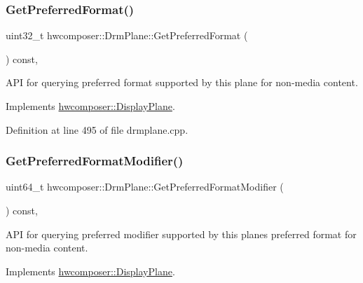 \subsubsection{\texorpdfstring{Get\+Preferred\+Format()}{GetPreferredFormat()}}
{\footnotesize\ttfamily uint32\+\_\+t hwcomposer\+::\+Drm\+Plane\+::\+Get\+Preferred\+Format (\begin{DoxyParamCaption}{ }\end{DoxyParamCaption}) const\hspace{0.3cm}{\ttfamily [override]}, {\ttfamily [virtual]}}

A\+PI for querying preferred format supported by this plane for non-\/media content. 

Implements \mbox{\hyperlink{classhwcomposer_1_1DisplayPlane_a963d17ec10be62d13f35a0b4ced4e8e1}{hwcomposer\+::\+Display\+Plane}}.



Definition at line 495 of file drmplane.\+cpp.


\begin{DoxyCode}{0}
\end{DoxyCode}
\mbox{\label{classhwcomposer_1_1DrmPlane_a185538f3aca7f84830f75f23efe551d6}} 
\subsubsection{\texorpdfstring{Get\+Preferred\+Format\+Modifier()}{GetPreferredFormatModifier()}}
{\footnotesize\ttfamily uint64\+\_\+t hwcomposer\+::\+Drm\+Plane\+::\+Get\+Preferred\+Format\+Modifier (\begin{DoxyParamCaption}{ }\end{DoxyParamCaption}) const\hspace{0.3cm}{\ttfamily [override]}, {\ttfamily [virtual]}}

A\+PI for querying preferred modifier supported by this plane\textquotesingle{}s preferred format for non-\/media content. 

Implements \mbox{\hyperlink{classhwcomposer_1_1DisplayPlane_ad95d2bd823ccf74fe3deccad7352f672}{hwcomposer\+::\+Display\+Plane}}.



